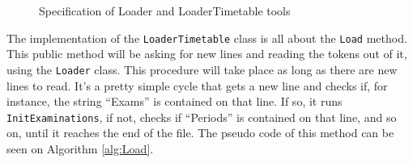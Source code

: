 \begin{figure}[t!]
\centering
{}

\caption{Specification of Loader and LoaderTimetable tools} \label{fig:Loaders}
\end{figure}The implementation of the \verb+LoaderTimetable+ class is all about the \verb+Load+ method. This public method will be asking for new lines and reading the tokens out of it, using the \verb+Loader+ class. This procedure will take place as long as there are new lines to read. It's a pretty simple cycle that gets a new line and checks if, for instance, the string ``Exams'' is contained on that line. If so, it runs \verb+InitExaminations+, if not, checks if ``Periods'' is contained on that line, and so on, until it reaches the end of the file. The pseudo code of this method can be seen on Algorithm \ref{alg:Load}.\\
\\
